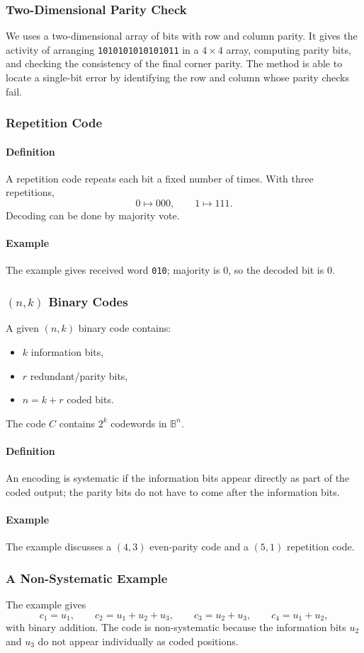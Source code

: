\documentclass[12pt]{article}
\newcommand{\Definition}{\paragraph{Definition}}
\newcommand{\Example}{\paragraph{Example}}
\begin{document}
\subsubsection{Two-Dimensional Parity Check}
We uses a two-dimensional array of bits with row and column parity. It gives the activity of arranging \texttt{1010101010101011} in a $4\times4$ array, computing parity bits, and checking the consistency of the final corner parity. The method is able to locate a single-bit error by identifying the row and column whose parity checks fail.

\subsubsection{Repetition Code}
\Definition A repetition code repeats each bit a fixed number of times. With three repetitions,
\[
0\mapsto000,\qquad1\mapsto111.
\]
Decoding can be done by majority vote.

\Example The example gives received word \texttt{010}; majority is 0, so the decoded bit is 0.

\subsubsection{$(n,k)$ Binary Codes}
A given $(n,k)$ binary code contains:
\begin{itemize}
    \item $k$ information bits,
    \item $r$ redundant/parity bits,
    \item $n=k+r$ coded bits.
\end{itemize}
The code $C$ contains $2^k$ codewords in $\mathbb{B}^n$.

\Definition An encoding is systematic if the information bits appear directly as part of the coded output; the parity bits do not have to come after the information bits.

\Example The example discusses a $(4,3)$ even-parity code and a $(5,1)$ repetition code.

\subsubsection{A Non-Systematic Example}
The example gives
\[
c_1=u_1,\qquad c_2=u_1+u_2+u_3,\qquad c_3=u_2+u_3,\qquad c_4=u_1+u_2,
\]
with binary addition. The code is non-systematic because the information bits $u_2$ and $u_3$ do not appear individually as coded positions.
\end{document}

